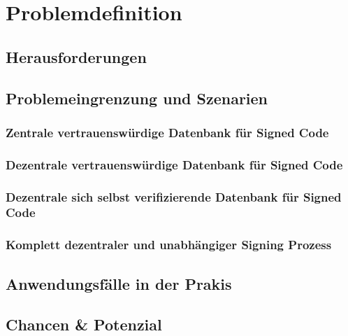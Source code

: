\section{Problemdefinition}
\tbd

\subsection{Herausforderungen}
\tbd

\subsection{Problemeingrenzung und Szenarien}
\subsubsection{Zentrale vertrauenswürdige Datenbank für Signed Code}
\tbd

\subsubsection{Dezentrale vertrauenswürdige Datenbank für Signed Code}
\tbd

\subsubsection{Dezentrale sich selbst verifizierende Datenbank für Signed Code}
\tbd

\subsubsection{Komplett dezentraler und unabhängiger Signing Prozess}
\tbd


\subsection{Anwendungsfälle in der Prakis}
\tbd

\subsection{Chancen \& Potenzial}
\tbd
